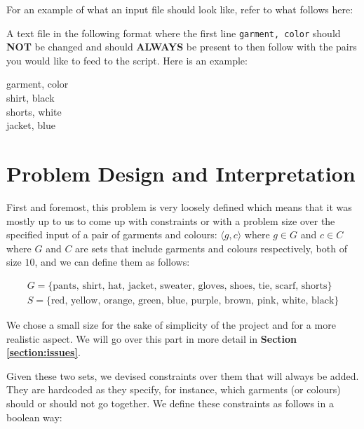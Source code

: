 \documentclass[12pt]{article}
\newcommand{\mygather}[1]{\begin{gather*} #1 \end{gather*}}
\begin{document}
For an example of what an input file should look like, refer to what follows here:

A text file in the following format where the first line \texttt{garment, color} should \textbf{NOT} be changed and should \textbf{ALWAYS} be present to then follow with the pairs you would like to feed to the script. Here is an example:

\begin{center}

	{
		\ttfamily
		garment, color\\
		shirt, black\\
		shorts, white\\
		jacket, blue\\
}
\end{center}

\section{Problem Design and Interpretation}\label{section:design}

    First and foremost, this problem is very loosely defined which means that it was mostly up to us to come up with constraints or with a problem size over the specified input of a pair of garments and colours: $\langle g, c \rangle$ where $g \in G$ and $c \in C$ where $G$ and $C$ are sets that include garments and colours respectively, both of size $10$, and we can define them as follows:

    \mygather{
        G = \{\text{pants, shirt, hat, jacket, sweater, gloves, shoes, tie, scarf, shorts} \} \\
        S = \{\text{red, yellow, orange, green, blue, purple, brown, pink, white, black} \}
    }

    We chose a small size for the sake of simplicity of the project and for a more realistic aspect. We will go over this part in more detail in \textbf{Section \ref{section:issues}}.

    Given these two sets, we devised constraints over them that will always be added. They are hardcoded as they specify, for instance, which garments (or colours) should or should not go together.
    We define these constraints as follows in a boolean way:
\end{document}
